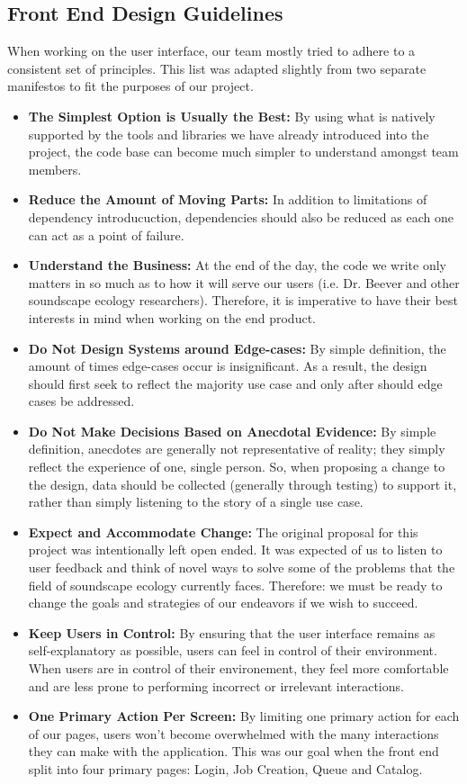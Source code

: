 \subsection{Front End Design Guidelines}
When working on the user interface, our team mostly tried to adhere to a consistent set of principles. This list was adapted slightly from two separate manifestos to fit the purposes of our project.\par

\begin{itemize}
\item \textbf{The Simplest Option is Usually the Best:} By using what is natively supported by the tools and libraries we have already introduced into the project, the code base can become much simpler to understand amongst team members.
\item \textbf{Reduce the Amount of Moving Parts:} In addition to limitations of dependency introducuction, dependencies should also be reduced as each one can act as a point of failure.
\item \textbf{Understand the Business:} At the end of the day, the code we write only matters in so much as to how it will serve our users (i.e. Dr. Beever and other soundscape ecology researchers). Therefore, it is imperative to have their best interests in mind when working on the end product.
\item \textbf{Do Not Design Systems around Edge-cases:} By simple definition, the amount of times edge-cases occur is insignificant. As a result, the design should first seek to reflect the majority use case and only after should edge cases be addressed.
\item \textbf{Do Not Make Decisions Based on Anecdotal Evidence:} By simple definition, anecdotes are generally not representative of reality; they simply reflect the experience of one, single person. So, when proposing a change to the design, data should be collected (generally through testing) to support it, rather than simply listening to the story of a single use case.
\item \textbf{Expect and Accommodate Change:} The original proposal for this project was intentionally left open ended. It was expected of us to listen to user feedback and think of novel ways to solve some of the problems that the field of soundscape ecology currently faces. Therefore: we must be ready to change the goals and strategies of our endeavors if we wish to succeed.
\item \textbf{Keep Users in Control:} By ensuring that the user interface remains as self-explanatory as possible, users can feel in control of their environment. When users are in control of their environement, they feel more comfortable and are less prone to performing incorrect or irrelevant interactions.
\item \textbf{One Primary Action Per Screen:} By limiting one primary action for each of our pages, users won't become overwhelmed with the many interactions they can make with the application. This was our goal when the front end split into four primary pages: Login, Job Creation, Queue and Catalog.
\end{itemize}
